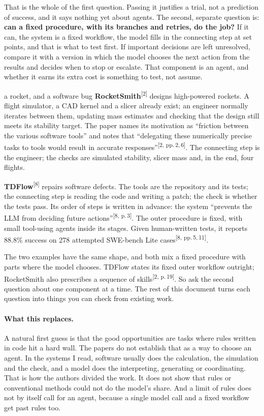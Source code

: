 \documentclass[10pt]{article}
\newcommand{\p}[1]{\textsuperscript{[#1]}}
\begin{document}
That is the whole of the first question. Passing it justifies a trial, not a prediction of success, and it says nothing yet about agents.
The second, separate question is: \textbf{can a fixed procedure, with its branches and retries, do the job?}
If it can, the system is a fixed workflow, the model fills in the connecting step at set points, and that is what to test first.
If important decisions are left unresolved, compare it with a version in which the model chooses the next action from the results and decides when to stop or escalate.
That component is an agent, and whether it earns its extra cost is something to test, not assume.

\begin{example}{a rocket, and a software bug}
\textbf{RocketSmith}\p{2} designs high-powered rockets. A flight simulator, a CAD kernel and a slicer already exist; an engineer normally iterates between them, updating mass estimates and checking that the design still meets its stability target. The paper names its motivation as ``friction between the various software tools'' and notes that ``delegating these numerically precise tasks to tools would result in accurate responses''\p{2, pp.\,2,\,6}. The connecting step is the engineer; the checks are simulated stability, slicer mass and, in the end, four flights.

\textbf{TDFlow}\p{8} repairs software defects. The tools are the repository and its tests; the connecting step is reading the code and writing a patch; the check is whether the tests pass. Its order of steps is written in advance: the system ``prevents the LLM from deciding future actions''\p{8, p.\,3}. The outer procedure is fixed, with small tool-using agents inside its stages. Given human-written tests, it reports 88.8\% success on 278 attempted SWE-bench Lite cases\p{8, pp.\,5,\,11}.
\end{example}

The two examples have the same shape, and both mix a fixed procedure with parts where the model chooses. TDFlow states its fixed outer workflow outright; RocketSmith also prescribes a sequence of skills\p{2, p.\,19}. So ask the second question about one component at a time.
The rest of this document turns each question into things you can check from existing work.

\paragraph{What this replaces.}
A natural first guess is that the good opportunities are tasks where rules written in code hit a hard wall.
The papers do not establish that as a way to choose an agent.
In the systems I read, software usually does the calculation, the simulation and the check, and a model does the interpreting, generating or coordinating.
That is how the authors divided the work. It does not show that rules or conventional methods could not do the model's share.
And a limit of rules does not by itself call for an agent, because a single model call and a fixed workflow get past rules too.
\end{document}

